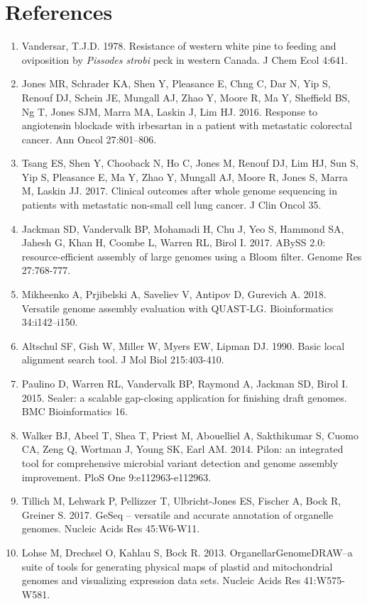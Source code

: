 \documentclass[titlepage,11pt, oneside]{article}   	%
\begin{document}
\section*{References}
\begin{enumerate}
\item Vandersar, T.J.D. 1978. Resistance of western white pine to feeding and oviposition by \textit{Pissodes strobi} peck in western Canada. J Chem Ecol 4:641.
\item Jones MR, Schrader KA, Shen Y, Pleasance E, Chng C, Dar N, Yip S, Renouf DJ, Schein JE, Mungall AJ, Zhao Y, Moore R, Ma Y, Sheffield BS, Ng T, Jones SJM, Marra MA, Laskin J, Lim HJ. 2016. Response to angiotensin blockade with irbesartan in a patient with metastatic colorectal cancer. Ann Oncol 27:801–806.
\item Tsang ES, Shen Y, Chooback N, Ho C, Jones M, Renouf DJ, Lim HJ, Sun S, Yip S, Pleasance E, Ma Y, Zhao Y, Mungall AJ, Moore R, Jones S, Marra M, Laskin JJ. 2017. Clinical outcomes after whole genome sequencing in patients with metastatic non-small cell lung cancer. J Clin Oncol 35.
\item Jackman SD, Vandervalk BP, Mohamadi H, Chu J, Yeo S, Hammond SA, Jahesh G, Khan H, Coombe L, Warren RL, Birol I. 2017. ABySS 2.0: resource-efficient assembly of large 
genomes using a Bloom filter. Genome Res 27:768-777.
\item Mikheenko A, Prjibelski A, Saveliev V, Antipov D, Gurevich A. 2018. Versatile genome assembly evaluation with QUAST-LG. Bioinformatics 34:i142–i150.
\item Altschul SF, Gish W, Miller W, Myers EW, Lipman DJ. 1990. Basic local alignment search tool. J Mol Biol 215:403-410.
\item Paulino D, Warren RL, Vandervalk BP, Raymond A, Jackman SD, Birol I. 2015. Sealer: a scalable gap-closing application for finishing draft genomes. BMC Bioinformatics 16.
\item Walker BJ, Abeel T, Shea T, Priest M, Abouelliel A, Sakthikumar S, Cuomo CA, Zeng Q, Wortman J, Young SK, Earl AM. 2014. Pilon: an integrated tool for comprehensive microbial variant detection and genome assembly improvement. PloS One 9:e112963-e112963.
\item Tillich M, Lehwark P, Pellizzer T, Ulbricht-Jones ES, Fischer A, Bock R, Greiner S. 2017. GeSeq – versatile and accurate annotation of organelle genomes. Nucleic Acids Res 45:W6-W11.
\item Lohse M, Drechsel O, Kahlau S, Bock R. 2013. OrganellarGenomeDRAW--a suite of tools for generating physical maps of plastid and mitochondrial genomes and visualizing expression data sets. Nucleic Acids Res 41:W575-W581.
\end{enumerate}
\end{document}
